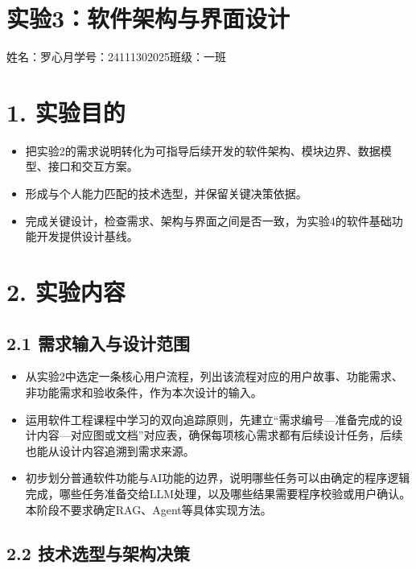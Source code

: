 \documentclass[UTF8,12pt,a4paper]{ctexart}
\begin{document}
\section*{实验3：软件架构与界面设计}

\begin{center}
姓名：罗心月\qquad 学号：24111302025\qquad 班级：一班
\end{center}

\section*{1. 实验目的}

\begin{itemize}
  \item 把实验2的需求说明转化为可指导后续开发的软件架构、模块边界、数据模型、接口和交互方案。
  \item 形成与个人能力匹配的技术选型，并保留关键决策依据。
  \item 完成关键设计，检查需求、架构与界面之间是否一致，为实验4的软件基础功能开发提供设计基线。
\end{itemize}

\section*{2. 实验内容}

\subsection*{2.1 需求输入与设计范围}

\begin{itemize}
  \item 从实验2中选定一条核心用户流程，列出该流程对应的用户故事、功能需求、非功能需求和验收条件，作为本次设计的输入。
  \item 运用软件工程课程中学习的双向追踪原则，先建立“需求编号—准备完成的设计内容—对应图或文档”对应表，确保每项核心需求都有后续设计任务，后续也能从设计内容追溯到需求来源。
  \item 初步划分普通软件功能与AI功能的边界，说明哪些任务可以由确定的程序逻辑完成，哪些任务准备交给LLM处理，以及哪些结果需要程序校验或用户确认。本阶段不要求确定RAG、Agent等具体实现方法。
\end{itemize}

\subsection*{2.2 技术选型与架构决策}
\end{document}
